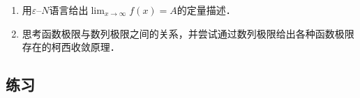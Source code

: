 \documentclass[a4paper,punct=CCT]{ctexbook}
\makeatletter
\theoremstyle{definition}
\theoremstyle{remark}
\newif\ifshowex
\newif\ifshowsolp
\renewcommand*{\proofname}{证}
\renewenvironment{proof}[1][\proofname]{\par
  \pushQED{\qed}%
  \normalfont \topsep6\p@\@plus6\p@\relax
  \trivlist
  \item[\hskip\labelsep
    \bfseries
    #1%
    ]\ignorespaces
}{%
  \popQED\endtrivlist\@endpefalse
}
\makeatother
\begin{document}
\begin{enumerate}
\item 用\(ε\)--\(N\)语言给出\(\lim_{x\to\infty} f(x) = A\)的定量描述．

  \ifshowsolp
  用形式语言的来定义，就是
  \begin{equation*}
    \paren[\big]{\forall ε > 0}
    \paren[\big]{\exists N > 0}
    \paren[\big]{\forall \abs{x} > N}
    \paren[\big]{\abs[\big]{\,f(x) - A} < ε}.
  \end{equation*}
  \fi

\item 思考函数极限与数列极限之间的关系，并尝试通过数列极限给出各种函数极限存在的柯西收敛原理．

  \ifshowsolp
  设函数\(f\)在点\(a\)附近有定义，当
  \begin{equation*}
    \paren[\big]{\forall ε > 0}
    \paren[\big]{\exists δ > 0}
    \paren[\big]{\forall \abs[\big]{x - a} < δ}
    \paren[\big]{\forall \abs[\big]{y - a} < δ}
    \paren[\big]{\abs[\big]{\,f(x) - f(y)} < ε}
  \end{equation*}
  时，我们称\(f\)在点\(a\)处柯西收敛．

  函数的柯西收敛原理无非是说：函数\(f\)在点\(a\)处极限存在的充分必要条件是它在点\(a\)处柯西收敛．

  \begin{proof}
    易证必要性．下面来证一下充分性．对于任意的\(ε > 0\)都存在\(δ > 0\)使得当\(\abs{x - a} < δ,\ \abs{y - a} < δ\)时都有\(\abs*{\,f(x) - f(y)} < ε\)．这时，对于任何收敛于\(a\)的非\(a\)数列\(\Seq{x_n}\)，自然存在一个正整数\(N\)使得：当\(n\)和\(m\)大于\(N\)时，都有\(\abs*{x_n - a} < δ\)和\(\abs*{x_m - a} < δ\)．所以有\(\abs*{\,f(x_n) - f(x_m)} < ε\)．这就说明数列\(\Seq{\,f(x_n)}\)是柯西列，从而收敛．与不同的数列\(\Seq{x_n}\)所对应的数列\(\Seq{\,f(x_n)}\)必然收敛于同一个数．因为假设收敛于不同的两个数，将不同的两个数列可以合并成一个新的数列\(\Seq{\bar x_n}\)，从而推出\(\Seq{\,f(\bar x_n)}\)发散．这和前面的结论时矛盾的．因此，函数\(f\)在点\(a\)处的极限存在．
  \end{proof}
  \fi
\end{enumerate}

\ifshowex
{}
\subsection*{练习}
\end{document}
